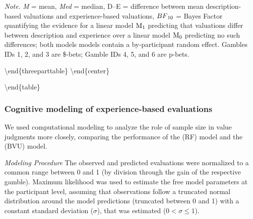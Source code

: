 \documentclass[a4paper, man, floatsintext]{apa6}
\begin{document}
\begin{tablenotes}[para]
\normalsize{\textit{Note.} \textit{M} = mean, \textit{Med} = median, D--E = difference between mean description-based valuations and experience-based valuations, $BF\textsubscript{10}$ = Bayes Factor quantifying the evidence for a linear model $\mathrm{M}\textsubscript{1}$ predicting that valuations differ between description and experience over a linear model $\mathrm{M}\textsubscript{0}$ predicting no such differences; both models models contain a by-participant random effect. Gambles IDs 1, 2, and 3 are \$-bets; Gamble IDs 4, 5, and 6 are p-bets.}
\end{tablenotes}

\textbackslash{}end\{threeparttable\} \textbackslash{}end\{center\}

\textbackslash{}end\{table\}

\subsubsection{Cognitive modeling of experience-based evaluations}

We used computational modeling to analyze the role of sample size in
value judgments more closely, comparing the performance of the
 (RF) model and the
 (BVU) model.

\textit{Modeling Procedure} The observed and predicted evaluations were
normalized to a common range between 0 and 1 (by division through the
gain of the respective gamble). Maximum likelihood was used to estimate
the free model parameters at the participant level, assuming that
observations follow a truncated normal distribution around the model
predictions (truncated between 0 and 1) with a constant standard
deviation (\(\sigma\)), that was estimated (\(0 < \sigma \leq 1\)).
\end{document}
